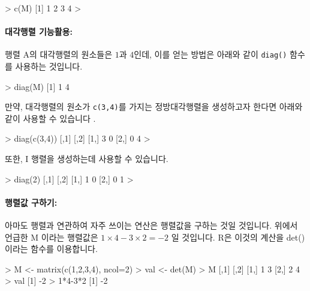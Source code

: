 \documentclass{book}
\begin{document}
\begin{Schunk}
\begin{Soutput}
> c(M)
[1] 1 2 3 4
> 
\end{Soutput}
\end{Schunk}


\paragraph{대각행렬 기능활용: } 행렬 A의 대각행렬의 원소들은 $1$과 $4$인데, 이를 얻는 방법은 아래와 같이 \texttt{diag()} 함수를 사용하는 것입니다. 

\begin{Schunk}
\begin{Soutput}
> diag(M)
[1] 1 4
\end{Soutput}
\end{Schunk}

만약, 대각행렬의 원소가 \texttt{c(3,4)}를 가지는 정방대각행렬을 생성하고자 한다면 아래와 같이 사용할 수 있습니다 .

\begin{Schunk}
\begin{Soutput}
> diag(c(3,4))
     [,1] [,2]
[1,]    3    0
[2,]    0    4
> 
\end{Soutput}
\end{Schunk}

또한, I 행렬을 생성하는데 사용할 수 있습니다. 

\begin{Schunk}
\begin{Soutput}
> diag(2)
     [,1] [,2]
[1,]    1    0
[2,]    0    1
>
\end{Soutput}
\end{Schunk}


\paragraph{행렬값 구하기: }  아마도 행렬과 연관하여 자주 쓰이는 연산은 행렬값을 구하는 것일 것입니다. 
위에서 언급한 M 이라는 행렬값은 $1\times 4 - 3\times 2 = -2$ 일 것입니다. 
R은 이것의 계산을 det()이라는 함수를 이용합니다. 

\begin{Schunk}
\begin{Soutput}
> M <- matrix(c(1,2,3,4), ncol=2)
> val <- det(M)
> M
     [,1] [,2]
[1,]    1    3
[2,]    2    4
> val
[1] -2
> 1*4-3*2
[1] -2
\end{Soutput}
\end{Schunk}
\end{document}
